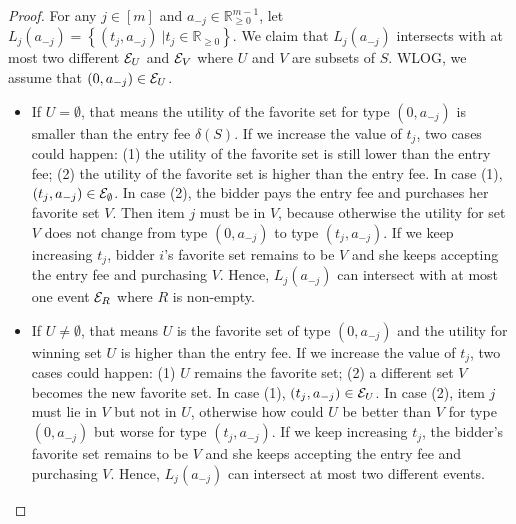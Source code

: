 \begin{proof}
For any $j\in[m]$ and $a_{-j}\in \mathbb{R}_{\geq 0}^{{m}-1}$, let $L_j(a_{-j})=\left\{ (t_{j},a_{-j}) \ | t_{j}\in \mathbb{R}_{\geq 0} \right\}$. We claim that $L_j(a_{-j})$ intersects with at most two different ${\mathcal{E}}_{U}$ and ${\mathcal{E}}_{V}$ where $U$ and $V$ are subsets of $S$. 
	WLOG, we assume that  $(0,a_{-j})\in {\mathcal{E}}_U$. 
	\begin{itemize}
		\item If $U=\emptyset$, that means the utility of the favorite set for type $(0,a_{-j})$ is smaller than the entry fee $\delta(S)$. If we increase the value of $t_{j}$, two cases could happen: (1) the utility of the favorite set is still lower than the entry fee; (2) the utility of the favorite set is higher than the entry fee. In case (1), $(t_{j},a_{-j})\in {\mathcal{E}}_{\emptyset}$. In case (2), the bidder pays the entry fee and purchases her favorite set $V$. Then item $j$ must be in $V$, because otherwise the utility for set $V$ does not change from type $(0,a_{-j})$ to type $(t_{j},a_{-j})$. If we keep increasing $t_{j}$, bidder $i$'s favorite set remains to be $V$ and she keeps accepting the entry fee and purchasing $V$. Hence, $L_j(a_{-j})$ can intersect with at most one event ${\mathcal{E}}_R$ where $R$ is non-empty.
		\item If $U\neq \emptyset$, that means $U$ is the favorite set of type $(0,a_{-j})$ and the utility for winning set $U$ is higher than the entry fee.  If we increase the value of $t_{j}$, two cases could happen: (1) $U$ remains the favorite set; (2) a different set $V$ becomes the new favorite set. In case (1), $(t_{j},a_{-j})\in {\mathcal{E}}_U$. In case (2), item $j$ must lie in $V$ but not in $U$, otherwise how could $U$ be better than $V$ for type $(0,a_{-j})$ but worse for type $(t_{j},a_{-j})$.  If we keep increasing $t_{j}$, the bidder's favorite set remains to be $V$ and she keeps accepting the entry fee and purchasing $V$. Hence, $L_j(a_{-j})$ can intersect at most two different events.
	\end{itemize}
	

\end{proof}
